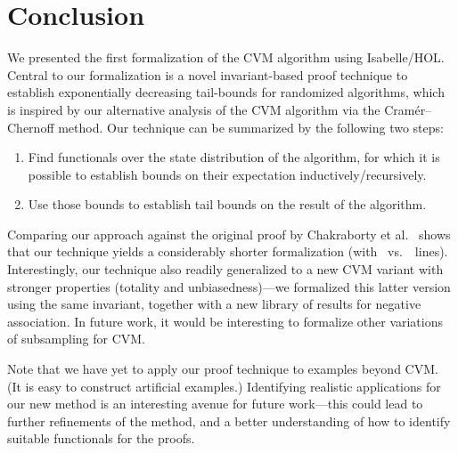 \section{Conclusion}\label{sec:conclusion}
We presented the first formalization of the CVM algorithm using Isabelle/HOL.
Central to our formalization is a novel invariant-based proof technique to establish exponentially decreasing tail-bounds for randomized algorithms, which is inspired by our alternative analysis of the CVM algorithm via the Cram\'{e}r--Chernoff method.
Our technique can be summarized by the following two steps:
\begin{enumerate}
\item Find functionals over the state distribution of the algorithm, for which it is possible to establish bounds on their expectation inductively/recursively.
\item Use those bounds to establish tail bounds on the result of the algorithm.
\end{enumerate}
Comparing our approach against the original proof by Chakraborty et al.~\cite{chakraborty2023} shows that our technique yields a considerably shorter formalization (with \locnew~vs.~\locold~lines).
Interestingly, our technique also readily generalized to a new CVM variant with stronger properties (totality and unbiasedness)---we formalized this latter version using the same invariant, together with a new library of results for negative association.
In future work, it would be interesting to formalize other variations of subsampling for CVM.

Note that we have yet to apply our proof technique to examples beyond CVM. (It is easy to construct artificial examples.)
Identifying realistic applications for our new method is an interesting avenue for future work---this could lead to further refinements of the method, and a better understanding of how to identify suitable functionals for the proofs.

